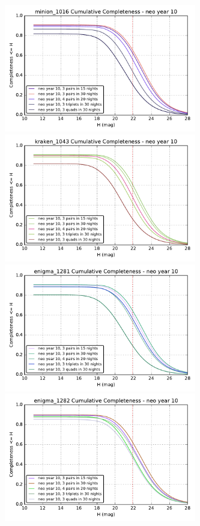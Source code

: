 \begin{figure}
\includegraphics[width=3.3in]{figs/solarsystem/minion_1016_CumulativeCompleteness_pairs_20_4_quads_3_30_3_30_triplets_3_30_pairs_3_15_pairs_nights_in_neo_year_10_MOOB_ComboMetricVsH}
\includegraphics[width=3.3in]{figs/solarsystem/kraken_1043_CumulativeCompleteness_pairs_20_4_quads_3_30_3_30_triplets_3_30_pairs_3_15_pairs_nights_in_neo_year_10_MOOB_ComboMetricVsH} \\
\includegraphics[width=3.3in]{figs/solarsystem/enigma_1281_CumulativeCompleteness_pairs_20_4_quads_3_30_3_30_triplets_3_30_pairs_3_15_pairs_nights_in_neo_year_10_MOOB_ComboMetricVsH}
\includegraphics[width=3.3in]{figs/solarsystem/enigma_1282_CumulativeCompleteness_pairs_20_4_quads_3_30_3_30_triplets_3_30_pairs_3_15_pairs_nights_in_neo_year_10_MOOB_ComboMetricVsH}

\end{figure}
